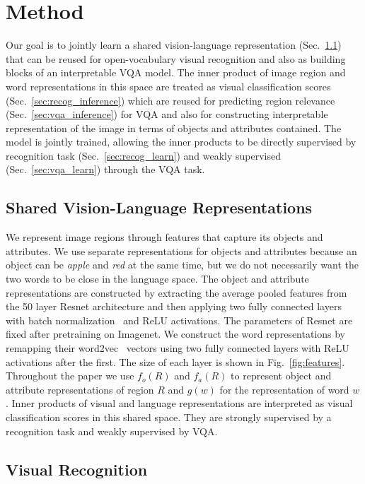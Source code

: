 \documentclass[10pt,twocolumn,letterpaper]{article}
\begin{document}
\section{Method}
Our goal is to jointly learn a shared vision-language representation (Sec.~\ref{sec:shared_rep}) that can be reused for open-vocabulary visual recognition and also as building blocks of an interpretable VQA model. The inner product of image region and word representations in this space are treated as visual classification scores (Sec.~\ref{sec:recog_inference}) which are reused for predicting region relevance (Sec.~\ref{sec:vqa_inference}) for VQA and also for constructing interpretable representation of the image in terms of objects and attributes contained. The model is jointly trained, allowing the inner products to be directly supervised by recognition task (Sec.~\ref{sec:recog_learn}) and weakly supervised (Sec.~\ref{sec:vqa_learn}) through the VQA task. 

\subsection{Shared Vision-Language Representations} \label{sec:shared_rep}
We represent image regions through features that capture its objects and attributes. We use separate representations for objects and attributes because an object can be \textit{apple} and \textit{red} at the same time, but we do not necessarily want the two words to be close in the language space. The object and attribute representations are constructed by extracting the average pooled features from the 50 layer Resnet \cite{he2015deep} architecture and then applying two fully connected layers with batch normalization~\cite{batchnorm} and ReLU activations. The parameters of Resnet are fixed after pretraining on Imagenet. We construct the word representations by remapping their word2vec~\cite{word2vec} vectors using two fully connected layers with ReLU activations after the first. The size of each layer is shown in Fig.~\ref{fig:features}. Throughout the paper we use $f_o(R)$ and $f_a(R)$ to represent object and attribute representations of region $R$ and $g(w)$ for the representation of word $w$. Inner products of visual and language representations are interpreted as visual classification scores in this shared space. They are strongly supervised by a recognition task and weakly supervised by VQA.

\subsection{Visual Recognition}
\end{document}
